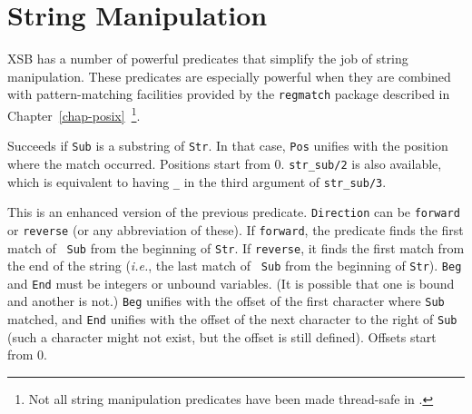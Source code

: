 
\section{String Manipulation}
\label{sec-strings}

XSB has a number of powerful predicates that simplify the job of
string manipulation. These predicates are especially powerful when
they are combined with pattern-matching facilities provided by the
{\tt regmatch} package described in
Chapter~\ref{chap-posix}~\footnote{Not all string
  manipulation predicates have been made thread-safe in \version{}.}.

\begin{description}

Succeeds if {\tt Sub} is a substring of {\tt Str}. In that case, {\tt Pos}
unifies with the position where the match occurred. Positions start
from 0. {\tt str\_sub/2} is also available, which is equivalent
to having {\tt \_} in the third argument of {\tt str\_sub/3}.


This is an enhanced version of the previous predicate.
{\tt Direction} can be {\tt forward} or {\tt reverse} (or any abbreviation
of these). If {\tt forward}, the predicate finds the first match of {\tt
  Sub} from the beginning of {\tt Str}. If {\tt reverse}, it finds the
first match from the end of the string ({\it i.e.}, the last match of {\tt
  Sub} from the beginning of {\tt Str}). {\tt Beg} and {\tt End} must be
integers or unbound variables. (It is possible that one is bound and
another is not.)
{\tt Beg} unifies with the offset of the first character where {\tt Sub}
matched, and {\tt End} unifies with the offset of the next character to the
right of {\tt Sub} (such a character might not exist, but the offset is
still defined). Offsets start from 0.


\end{description}
